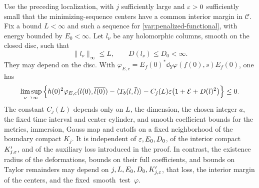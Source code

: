 \begin{lemma}
\label{lem:disc-deformation}
Use the preceding localization, with $j$ sufficiently large and
$\varepsilon>0$ sufficiently small that the minimizing-sequence centers have
a common interior margin in $\mathcal C$.  Fix a bound $L<\infty$
and such a sequence for \eqref{var:penalized-functional}, with energy
bounded by $E_0<\infty$.  Let $l_\nu$ be any holomorphic columns, smooth on the
closed disc, such that
\[
 \|l_\nu\|_\infty\le L,\qquad D(l_\nu)\le D_0<\infty.
\]
They may depend on the disc.  With
$\varphi_{E,c}=E_f(0)^*\dd_Y\varphi(f(0),s)E_f(0)$, one has
\begin{equation}
 \limsup_{\nu\to\infty}
 \left\{
 h(0)^2\varphi_{E,c}(l(0),\overline{l(0)})
 -\langle T_b(l,\bar l)\rangle
 -C_j(L)\varepsilon\bigl(1+\mathcal E+D(l)^2\bigr)
 \right\}\le0.
 \label{var:deformation-estimate}
\end{equation}
The constant $C_j(L)$ depends only on $L$, the dimension, the chosen
integer $a$, the fixed time interval and center cylinder, and smooth
coefficient bounds for the metrics, immersion, Gauss map and cutoffs
on a fixed neighborhood of the boundary compact $K_j$.
It is independent of $\varepsilon,E_0,D_0$, of the interior
compact $K_{j,\varepsilon}'$, and of the auxiliary loss introduced in the proof.
In contrast, the existence radius of the deformations, bounds on their
full coefficients, and bounds on Taylor remainders may depend on
$j,L,E_0,D_0,K_{j,\varepsilon}'$, that loss, the interior margin of the
centers, and the fixed~smooth~test~$\varphi$.
\end{lemma}

